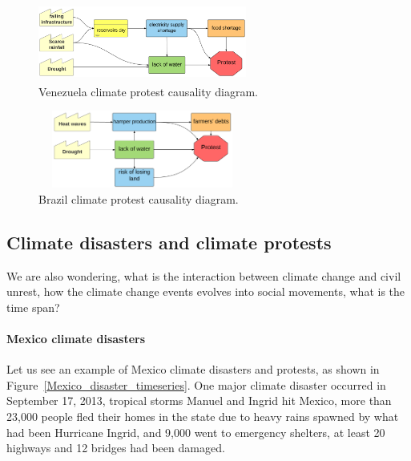 \documentclass[9pt,twocolumn,twoside]{pnas-new}
\begin{document}
\begin{figure}[ht]
\centerline
{\includegraphics[height=1in, width=2.7in]{figures/Venezuela-diagram2}}
\caption{Venezuela climate protest causality diagram.}
\label{Venezuela-causality}
\end{figure}

\begin{figure}[ht]
\centerline
{\includegraphics[height=1in, width=2.7in]{figures/Brazil-diagram}}
\caption{Brazil climate protest causality diagram.}
\label{Brazil-causality}
\end{figure}




\subsection{Climate disasters and climate protests}
We are also wondering, what is the interaction between climate change and civil unrest, how the climate change events evolves into social movements, what is the time span?

\paragraph{Mexico climate disasters}
Let us see an example of Mexico climate disasters and protests, as shown in Figure~\ref{Mexico_disaster_timeseries}. One major climate disaster occurred in September 17, 2013, tropical storms Manuel and Ingrid hit Mexico, more than 23,000 people fled their homes in the state due to heavy rains spawned by what had been Hurricane Ingrid, and 9,000 went to emergency shelters, at least 20 highways and 12 bridges had been damaged.
\end{document}
